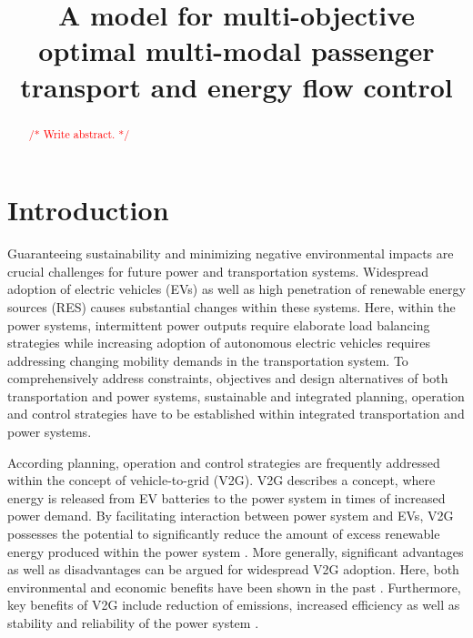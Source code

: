 \documentclass[conference]{IEEEtran}
\newcommand{\todo}[1]{\textcolor{red}{/* #1 */}}
\begin{document}
	
	\title{A model for multi-objective optimal multi-modal passenger transport and energy flow control}
	
	\author{
		\and
		\and
	}

	\maketitle
	
	\begin{abstract}
		\todo{Write abstract.}
	\end{abstract}
	
	\section{Introduction}
	
	Guaranteeing sustainability and minimizing negative environmental impacts are crucial challenges for future power and transportation systems. Widespread adoption of electric vehicles (EVs) as well as high penetration of renewable energy sources (RES) causes substantial changes within these systems. Here, within the power systems, intermittent power outputs require elaborate load balancing strategies while increasing adoption of autonomous electric vehicles requires addressing changing mobility demands in the transportation system. To comprehensively address constraints, objectives and design alternatives of both transportation and power systems, sustainable and integrated planning, operation and control strategies have to be established within integrated transportation and power systems.
	
	According planning, operation and control strategies are frequently  addressed within the concept of vehicle-to-grid (V2G). V2G describes a concept, where energy is released from EV batteries to the power system in times of increased power demand.  By facilitating interaction between power system and EVs, V2G possesses the potential to significantly reduce the amount of excess renewable energy produced within the power system \cite{richardson2013electric}. More generally, significant advantages as well as disadvantages can be argued for widespread V2G adoption. Here, both environmental and economic benefits have been shown in the past \cite{faria2012sustainability, richardson2013electric, mwasilu2014electric}. Furthermore, key benefits of V2G include reduction of emissions, increased efficiency as well as stability and reliability of the power system \cite{yilmaz2013review}.
	
\end{document}
